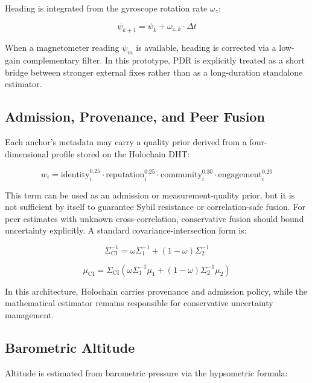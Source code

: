 \documentclass[12pt,a4paper]{article}
\begin{document}
Heading is integrated from the gyroscope rotation rate $\omega_z$:

\begin{equation}
\psi_{k+1} = \psi_k + \omega_{z,k} \cdot \Delta t
\end{equation}

When a magnetometer reading $\psi_m$ is available, heading is corrected via a low-gain complementary filter. In this prototype, PDR is explicitly treated as a short bridge between stronger external fixes rather than as a long-duration standalone estimator.

\subsection{Admission, Provenance, and Peer Fusion}

Each anchor's metadata may carry a quality prior derived from a four-dimensional profile stored on the Holochain DHT:

\begin{equation}
w_i = \text{identity}_i^{0.25} \cdot \text{reputation}_i^{0.25} \cdot \text{community}_i^{0.30} \cdot \text{engagement}_i^{0.20}
\end{equation}

This term can be used as an admission or measurement-quality prior, but it is not sufficient by itself to guarantee Sybil resistance or correlation-safe fusion. For peer estimates with unknown cross-correlation, conservative fusion should bound uncertainty explicitly. A standard covariance-intersection form is:

\begin{equation}
\Sigma_{\text{CI}}^{-1} = \omega \Sigma_1^{-1} + (1-\omega)\Sigma_2^{-1}
\end{equation}

\begin{equation}
\mu_{\text{CI}} = \Sigma_{\text{CI}} \left( \omega \Sigma_1^{-1}\mu_1 + (1-\omega)\Sigma_2^{-1}\mu_2 \right)
\end{equation}

In this architecture, Holochain carries provenance and admission policy, while the mathematical estimator remains responsible for conservative uncertainty management.

\subsection{Barometric Altitude}

Altitude is estimated from barometric pressure via the hypsometric formula:
\end{document}
